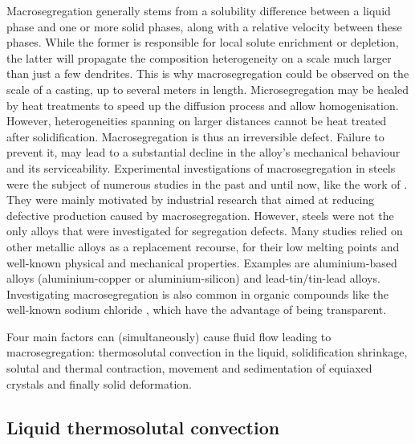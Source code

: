 Macrosegregation generally stems from a solubility difference between a liquid phase and one or more solid phases, along with
a relative velocity between these phases. While the former is responsible for local solute enrichment or depletion, the latter
will propagate the composition heterogeneity on a scale much larger than just a few dendrites.
This is why macrosegregation could be observed on the scale of a casting, up to several meters in length. 
Microsegregation may be healed by heat treatments to speed up the diffusion process and allow homogenisation. However, heterogeneities 
spanning on larger distances cannot be heat treated after solidification. Macrosegregation is thus an irreversible defect.
Failure to prevent it, may lead to a substantial decline in the alloy's mechanical behaviour and its serviceability.
Experimental investigations of macrosegregation in steels were the subject of numerous studies in the past and until now, 
like the work of \citet{suzuki_mechanism_1973,shah_effect_1989,lesoult_macrosegregation_2005}. They were mainly motivated
by industrial research that aimed at reducing defective production caused by macrosegregation.
However, steels were not the only alloys that were investigated for segregation defects. 
Many studies relied on other metallic alloys as a replacement recourse, for their low
melting points and well-known physical and mechanical properties. Examples are aluminium-based alloys 
(aluminium-copper or aluminium-silicon) \citep{lesoult_equi-axed_2001,ferreira_macrosegregation_2004,ferreira_modeling_2009} 
and lead-tin/tin-lead alloys\citep{hebditch_observations_1974,prescott_convective_1994,hachani_experimental_2012}. Investigating macrosegregation 
is also common in organic compounds like the well-known 
sodium chloride \citep{wanqi_formation_1989,sarazin_studies_1992,ludwig_advanced_2012}, which have the advantage of being transparent.


Four main factors can (simultaneously) cause fluid flow leading to macrosegregation:
thermosolutal convection in the liquid, solidification shrinkage, solutal and thermal contraction,
movement and sedimentation of equiaxed crystals and finally solid deformation.

\subsection{Liquid thermosolutal convection}

